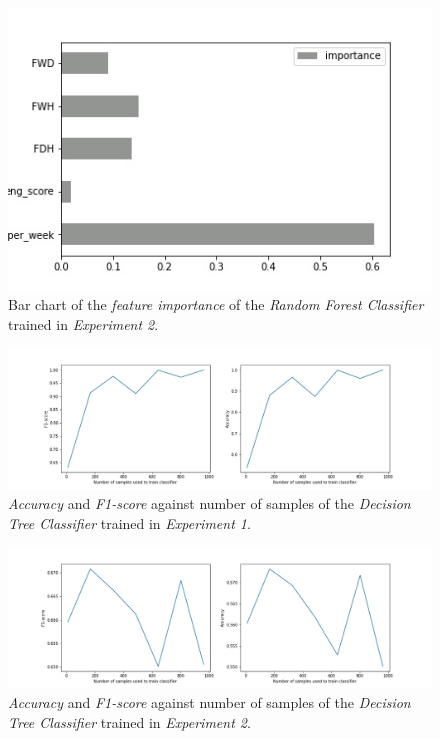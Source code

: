 \documentclass[sigplan,screen]{acmart}
\begin{document}
 \begin{figure}[h]
     \centering
     \includegraphics[width=0.5\linewidth]{reports/figures/feature_importance_rf_2.jpg}
     \caption{Bar chart of the \emph{feature importance} of the \emph{Random Forest Classifier} trained in \emph{Experiment 2}.}
     \label{fig:fi_rf_2}
 \end{figure}
 
  \begin{figure}[h]
     \centering
     \includegraphics[width=\linewidth]{reports/figures/results_dc_1.jpg}
     \caption{\emph{Accuracy} and \emph{F1-score} against number of samples of the \emph{Decision Tree Classifier} trained in \emph{Experiment 1}.}
     \label{fig:results_dt_1}
 \end{figure}
 
  \begin{figure}[h]
     \centering
     \includegraphics[width=\linewidth]{reports/figures/results_dc_2.jpg}
     \caption{\emph{Accuracy} and \emph{F1-score} against number of samples of the \emph{Decision Tree Classifier} trained in \emph{Experiment 2}.}
     \label{fig:results_dt_2}
 \end{figure}
\end{document}
